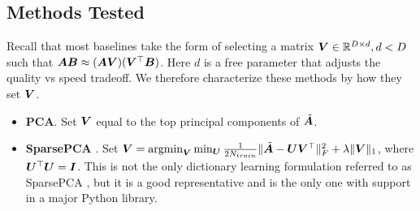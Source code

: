 \vspace{-1mm}
\subsection{Methods Tested}
\vspace{-.5mm}
Recall that most baselines take the form of selecting a matrix $\bm{V} \in \mathbb{R}^{D \times d}, d < D$ such that $\bm{A} \bm{B} \approx (\bm{A} \bm{V}) (\bm{V}^\top \bm{B})$. Here $d$ is a free parameter that adjusts the quality vs speed tradeoff. We therefore characterize these methods by how they set $\bm{V}$.
\vspace{-2.5mm}
\begin{itemize}\itemsep-.5mm
    \item \textbf{PCA}. Set $\bm{V}$ equal to the top principal components of $\tilde{\bm{A}}$.
    \item \textbf{SparsePCA} \cite{sparsePCA}. Set $\bm{V} = \operatorname*{argmin}_{\bm{V}} \min_{\bm{U}} \frac{1}{2 N_{train}} \lVert \tilde{\bm{A}} - \bm{U}\bm{V}^\top \rVert^2_F + \lambda \lVert\bm{V}\rVert_1$, where $\bm{U}^\top \bm{U} = \bm{I}$. This is not the only dictionary learning formulation referred to as SparsePCA \cite{spcaSurvey1,spcaSurvey2}, but it is a good representative and is the only one with support in a major Python library.%



\end{itemize}
